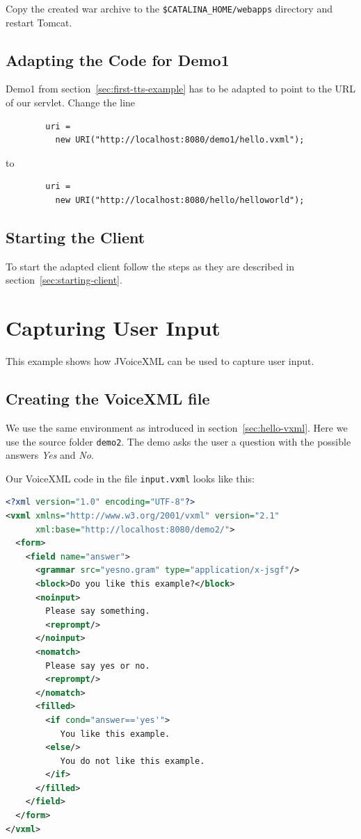 \documentclass[11pt,a4paper]{article}
\begin{document}
Copy the created war archive to the \texttt{\$CATALINA\_HOME/web\-apps}
directory and restart Tomcat.

\subsection{Adapting the Code for Demo1}

Demo1 from section~\ref{sec:first-tts-example} has to be adapted to point to
the URL of our servlet. Change the line
\begin{lstlisting}
        uri = 
          new URI("http://localhost:8080/demo1/hello.vxml");
\end{lstlisting}
to
\begin{lstlisting}
        uri = 
          new URI("http://localhost:8080/hello/helloworld");
\end{lstlisting}

\subsection{Starting the Client}

To start the adapted client follow the steps as they are described in
section~\ref{sec:starting-client}.

\section{Capturing User Input}

This example shows how JVoiceXML can be used to capture user input. 

\subsection{Creating the VoiceXML file}

We use the same environment as introduced in section~\ref{sec:hello-vxml}. Here
we use the source folder \texttt{demo2}.
The demo asks the user a question with the possible answers
\emph{Yes} and \emph{No}.

Our VoiceXML code in the file \texttt{input.vxml} looks like this:

\begin{lstlisting}[language=XML]
<?xml version="1.0" encoding="UTF-8"?> 
<vxml xmlns="http://www.w3.org/2001/vxml" version="2.1"
      xml:base="http://localhost:8080/demo2/">
  <form>
    <field name="answer">
      <grammar src="yesno.gram" type="application/x-jsgf"/>
      <block>Do you like this example?</block>
      <noinput>
        Please say something.
        <reprompt/>
      </noinput>
      <nomatch>
        Please say yes or no.
        <reprompt/>
      </nomatch>
      <filled>
        <if cond="answer=='yes'">
           You like this example.
        <else/>
           You do not like this example.
        </if>
      </filled>
    </field>
  </form>
</vxml>
\end{lstlisting}
\end{document}
